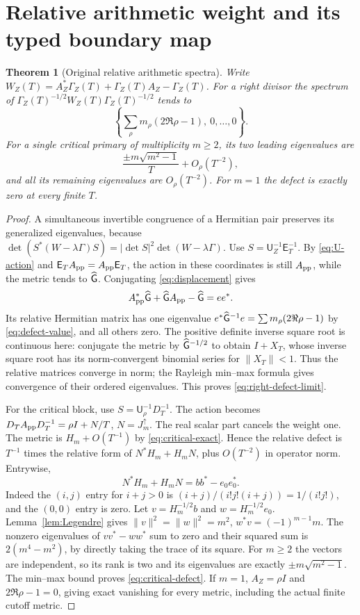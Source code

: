\documentclass[11pt]{article}
\newtheorem{theorem}{Theorem}[section]
\newcommand{\U}{\mathsf U}\newcommand{\E}{\mathsf E}
\begin{document}
\section{Relative arithmetic weight and its typed boundary map}\label{sec:action}
\begin{theorem}[Original relative arithmetic spectra]\label{thm:relative}
Write $W_Z(T)=A_Z^*\Gamma_Z(T)+\Gamma_Z(T)A_Z-\Gamma_Z(T)$.
For a right divisor the spectrum of
$\Gamma_Z(T)^{-1/2}W_Z(T)\Gamma_Z(T)^{-1/2}$ tends to
\[
 \left\{\sum_\rho m_\rho(2\Re\rho-1),\ 0,\ldots,0\right\}.
 \tag{EG49}\label{eq:right-defect-limit}
\]
For a single critical primary of multiplicity $m\ge2$, its two
leading eigenvalues are
\[
 \frac{\pm m\sqrt{m^2-1}}T+O_\rho(T^{-2}),
 \tag{EG50}\label{eq:critical-defect}
\]
and all its remaining eigenvalues are $O_\rho(T^{-2})$. For $m=1$
the defect is exactly zero at every finite $T$.
\end{theorem}
\begin{proof}
A simultaneous invertible congruence of a Hermitian pair preserves
its generalized eigenvalues, because
$\det(S^*(W-\lambda\Gamma)S)=|\det S|^2\det(W-\lambda\Gamma)$.
Use $S=\U_Z^{-1}\E_T^{-1}$. By \eqref{eq:U-action} and
$\E_TA_{\rm pp}=A_{\rm pp}\E_T$, the action in these coordinates
is still $A_{\rm pp}$, while the metric tends to $\widehat{\mathsf G}$.
Conjugating \eqref{eq:displacement} gives
\[
 A_{\rm pp}^*\widehat{\mathsf G}+\widehat{\mathsf G} A_{\rm pp}-\widehat{\mathsf G}=ee^*.
\]
Its relative Hermitian matrix has one eigenvalue
$e^*\widehat{\mathsf G}^{-1}e=\sum m_\rho(2\Re\rho-1)$ by
\eqref{eq:defect-value}, and all others zero.
The positive definite inverse square root is continuous here:
conjugate the metric by $\widehat{\mathsf G}^{-1/2}$ to obtain $I+X_T$,
whose inverse square root has its norm-convergent binomial series
for $\|X_T\|<1$. Thus the relative matrices converge in norm;
the Rayleigh min--max formula gives convergence of their ordered
eigenvalues. This proves \eqref{eq:right-defect-limit}.

For the critical block, use $S=\U_\rho^{-1}D_T^{-1}$.
The action becomes
$D_TA_{\rm pp}D_T^{-1}=\rho I+N/T$, $N=J_m^\uparrow$.
The real scalar part cancels the weight one. The metric is
$H_m+O(T^{-1})$ by \eqref{eq:critical-exact}. Hence the relative
defect is $T^{-1}$ times the relative form of
$N^*H_m+H_mN$, plus $O(T^{-2})$ in operator norm. Entrywise,
\[
 N^*H_m+H_mN=bb^*-e_0e_0^*.
\]
Indeed the $(i,j)$ entry for $i+j>0$ is
$(i+j)/(i!j!(i+j))=1/(i!j!)$, and the $(0,0)$ entry is zero.
Let $v=H_m^{-1/2}b$ and $w=H_m^{-1/2}e_0$.
Lemma~\ref{lem:Legendre} gives
$\|v\|^2=\|w\|^2=m^2$, $w^*v=(-1)^{m-1}m$.
The nonzero eigenvalues of $vv^*-ww^*$ sum to zero and their
squared sum is $2(m^4-m^2)$, by directly taking the trace of
its square. For $m\ge2$ the vectors are independent, so its rank
is two and its eigenvalues are exactly $\pm m\sqrt{m^2-1}$.
The min--max bound proves \eqref{eq:critical-defect}. If $m=1$,
$A_Z=\rho I$ and $2\Re\rho-1=0$, giving exact vanishing for
every metric, including the actual finite cutoff metric.
\end{proof}
\end{document}
